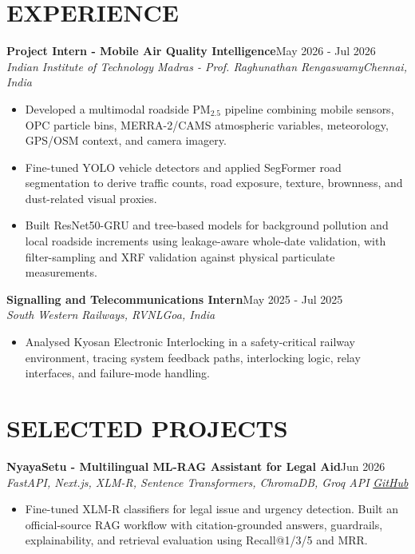 \documentclass[9pt,a4paper]{extarticle}
\newcommand{\subhdr}[2]{\textbf{#1}\hfill #2}
\newcommand{\roleline}[2]{\textit{#1}\hfill \textit{#2}}
\newcommand{\entryspace}{\vspace{2.0pt}}
\begin{document}
\section*{EXPERIENCE}
\subhdr{Project Intern - Mobile Air Quality Intelligence}{May 2026 - Jul 2026}\\[-0.5pt]
\roleline{Indian Institute of Technology Madras - Prof. Raghunathan Rengaswamy}{Chennai, India}
\begin{itemize}
  \item Developed a multimodal roadside PM$_{2.5}$ pipeline combining mobile sensors, OPC particle bins, MERRA-2/CAMS atmospheric variables, meteorology, GPS/OSM context, and camera imagery.
  \item Fine-tuned YOLO vehicle detectors and applied SegFormer road segmentation to derive traffic counts, road exposure, texture, brownness, and dust-related visual proxies.
  \item Built ResNet50-GRU and tree-based models for background pollution and local roadside increments using leakage-aware whole-date validation, with filter-sampling and XRF validation against physical particulate measurements.
\end{itemize}

\entryspace
\subhdr{Signalling and Telecommunications Intern}{May 2025 - Jul 2025}\\[-0.5pt]
\roleline{South Western Railways, RVNL}{Goa, India}
\begin{itemize}
  \item Analysed Kyosan Electronic Interlocking in a safety-critical railway environment, tracing system feedback paths, interlocking logic, relay interfaces, and failure-mode handling.
\end{itemize}

\section*{SELECTED PROJECTS}
\subhdr{NyayaSetu - Multilingual ML-RAG Assistant for Legal Aid}{Jun 2026}\\[-0.5pt]
\textit{FastAPI, Next.js, XLM-R, Sentence Transformers, ChromaDB, Groq API}
\hfill \textit{\href{https://github.com/Kumaryan12/nyaysetu}{GitHub}}
\begin{itemize}
  \item Fine-tuned XLM-R classifiers for legal issue and urgency detection. Built an official-source RAG workflow with citation-grounded answers, guardrails, explainability, and retrieval evaluation using Recall@1/3/5 and MRR.
\end{itemize}
\end{document}
